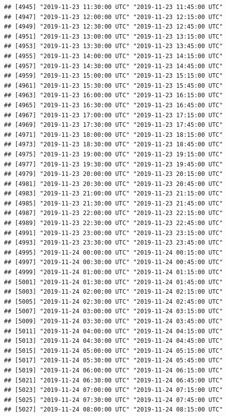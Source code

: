 \documentclass{article}\usepackage[]{graphicx}\usepackage[]{color}
\makeatletter
\newenvironment{kframe}{%
 \def\at@end@of@kframe{}%
 \ifinner\ifhmode%
  \def\at@end@of@kframe{\end{minipage}}%
  \begin{minipage}{\columnwidth}%
 \fi\fi%
 \def\FrameCommand##1{\hskip\@totalleftmargin \hskip-\fboxsep
 \colorbox{shadecolor}{##1}\hskip-\fboxsep
     \hskip-\linewidth \hskip-\@totalleftmargin \hskip\columnwidth}%
 \MakeFramed {\advance\hsize-\width
   \@totalleftmargin\z@ \linewidth\hsize
   \@setminipage}}%
 {\par\unskip\endMakeFramed%
 \at@end@of@kframe}
\newenvironment{knitrout}{}{} %
\makeatother
\begin{document}
\begin{knitrout}
\begin{kframe}
\begin{verbatim}
## [4945] "2019-11-23 11:30:00 UTC" "2019-11-23 11:45:00 UTC"
## [4947] "2019-11-23 12:00:00 UTC" "2019-11-23 12:15:00 UTC"
## [4949] "2019-11-23 12:30:00 UTC" "2019-11-23 12:45:00 UTC"
## [4951] "2019-11-23 13:00:00 UTC" "2019-11-23 13:15:00 UTC"
## [4953] "2019-11-23 13:30:00 UTC" "2019-11-23 13:45:00 UTC"
## [4955] "2019-11-23 14:00:00 UTC" "2019-11-23 14:15:00 UTC"
## [4957] "2019-11-23 14:30:00 UTC" "2019-11-23 14:45:00 UTC"
## [4959] "2019-11-23 15:00:00 UTC" "2019-11-23 15:15:00 UTC"
## [4961] "2019-11-23 15:30:00 UTC" "2019-11-23 15:45:00 UTC"
## [4963] "2019-11-23 16:00:00 UTC" "2019-11-23 16:15:00 UTC"
## [4965] "2019-11-23 16:30:00 UTC" "2019-11-23 16:45:00 UTC"
## [4967] "2019-11-23 17:00:00 UTC" "2019-11-23 17:15:00 UTC"
## [4969] "2019-11-23 17:30:00 UTC" "2019-11-23 17:45:00 UTC"
## [4971] "2019-11-23 18:00:00 UTC" "2019-11-23 18:15:00 UTC"
## [4973] "2019-11-23 18:30:00 UTC" "2019-11-23 18:45:00 UTC"
## [4975] "2019-11-23 19:00:00 UTC" "2019-11-23 19:15:00 UTC"
## [4977] "2019-11-23 19:30:00 UTC" "2019-11-23 19:45:00 UTC"
## [4979] "2019-11-23 20:00:00 UTC" "2019-11-23 20:15:00 UTC"
## [4981] "2019-11-23 20:30:00 UTC" "2019-11-23 20:45:00 UTC"
## [4983] "2019-11-23 21:00:00 UTC" "2019-11-23 21:15:00 UTC"
## [4985] "2019-11-23 21:30:00 UTC" "2019-11-23 21:45:00 UTC"
## [4987] "2019-11-23 22:00:00 UTC" "2019-11-23 22:15:00 UTC"
## [4989] "2019-11-23 22:30:00 UTC" "2019-11-23 22:45:00 UTC"
## [4991] "2019-11-23 23:00:00 UTC" "2019-11-23 23:15:00 UTC"
## [4993] "2019-11-23 23:30:00 UTC" "2019-11-23 23:45:00 UTC"
## [4995] "2019-11-24 00:00:00 UTC" "2019-11-24 00:15:00 UTC"
## [4997] "2019-11-24 00:30:00 UTC" "2019-11-24 00:45:00 UTC"
## [4999] "2019-11-24 01:00:00 UTC" "2019-11-24 01:15:00 UTC"
## [5001] "2019-11-24 01:30:00 UTC" "2019-11-24 01:45:00 UTC"
## [5003] "2019-11-24 02:00:00 UTC" "2019-11-24 02:15:00 UTC"
## [5005] "2019-11-24 02:30:00 UTC" "2019-11-24 02:45:00 UTC"
## [5007] "2019-11-24 03:00:00 UTC" "2019-11-24 03:15:00 UTC"
## [5009] "2019-11-24 03:30:00 UTC" "2019-11-24 03:45:00 UTC"
## [5011] "2019-11-24 04:00:00 UTC" "2019-11-24 04:15:00 UTC"
## [5013] "2019-11-24 04:30:00 UTC" "2019-11-24 04:45:00 UTC"
## [5015] "2019-11-24 05:00:00 UTC" "2019-11-24 05:15:00 UTC"
## [5017] "2019-11-24 05:30:00 UTC" "2019-11-24 05:45:00 UTC"
## [5019] "2019-11-24 06:00:00 UTC" "2019-11-24 06:15:00 UTC"
## [5021] "2019-11-24 06:30:00 UTC" "2019-11-24 06:45:00 UTC"
## [5023] "2019-11-24 07:00:00 UTC" "2019-11-24 07:15:00 UTC"
## [5025] "2019-11-24 07:30:00 UTC" "2019-11-24 07:45:00 UTC"
## [5027] "2019-11-24 08:00:00 UTC" "2019-11-24 08:15:00 UTC"

\end{verbatim}
\end{kframe}
\end{knitrout}
\end{document}
